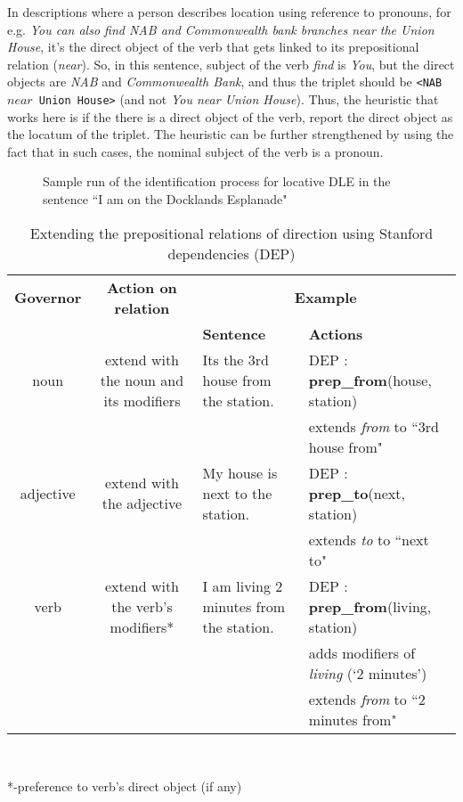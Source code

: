 \documentclass{acm_proc_article-sp}
\begin{document}
In descriptions where a person describes location using reference to pronouns, for e.g. \textit{You can also find NAB and Commonwealth bank branches near the Union House}, it's the direct object of the verb that gets linked to its prepositional relation (\textit{near}). So, in this sentence, subject of the verb \textit{find} is \textit{You}, but the direct objects are \textit{NAB} and \textit{Commonwealth Bank}, and thus the triplet should be \texttt{<NAB $near$ Union House>} (and not \textit{You near Union House}). Thus, the heuristic that works here is if the there is a direct object of the verb, report the direct object as the locatum of the triplet. The heuristic can be further strengthened by using the fact that in such cases, the nominal subject of the verb is a pronoun.
\begin{figure}
\centering
\caption{Sample run of the identification process for locative DLE in the sentence  ``I am on the Docklands Esplanade"}
\label{fig:phase1}
\end{figure}
\begin{table*}
\centering
\caption{Extending the prepositional relations of direction using Stanford dependencies (DEP)}
\begin{tabular}{|c|c|p{4cm}|p{5cm}|} \hline
\textbf{Governor}&\textbf{Action on relation}&\multicolumn{2}{|c|}{\textbf{Example}} \\ \cline{3-4} 
&&\textbf{Sentence}&\textbf{Actions}\\ \hline
noun & extend with the noun and its modifiers&Its the 3rd house from the station.&DEP : \textbf{prep\_from}(house, station) \\&&&extends \textit{from} to ``3rd house from" \\ \hline
adjective & extend with the adjective&My house is next to the station.&DEP : {\textbf{prep\_to}}(next, station) \\&&& extends \textit{to} to ``next to"\\ \hline
verb & extend with the verb's modifiers*&I am living 2 minutes from the station.&DEP : \textbf{prep\_from}(living, station)\\&&& adds modifiers of \textit{living} (`2 minutes')\\&&& extends \textit{from} to ``2 minutes from"\\ 
\hline\end{tabular}
\\ \begin{flushleft}
*-preference to verb's direct object (if any)
\end{flushleft}
\label{table:partial}
\end{table*}
\end{document}
